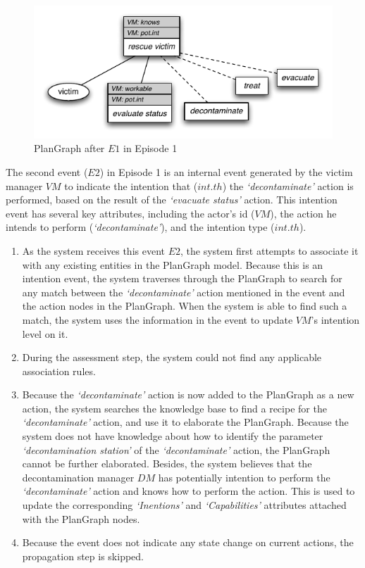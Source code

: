 \begin{figure}[htbp] %
	\centering
	\includegraphics{plangraph_ep1_e1.pdf} 
	\caption{PlanGraph after $E1$ in Episode 1}
	\label{fig:plangraph_ep1_e1}
\end{figure}

The second event ($E2$) in Episode 1 is an internal event generated by the victim manager $VM$ to indicate the intention that ($int.th$) the \emph{`decontaminate'} action is performed, based on the result of the \emph{`evacuate status'} action. This intention event has several key attributes, including the actor's id ($VM$), the action he intends to perform (\emph{`decontaminate'}), and the intention type ($int.th$).

\begin{enumerate}
	\item As the system receives this event $E2$, the system first attempts to associate it with any existing entities in the PlanGraph model. Because this is an intention event, the system traverses through the PlanGraph to search for any match between the \emph{`decontaminate'} action mentioned in the event and the action nodes in the PlanGraph. When the system is able to find such a match, the system uses the information in the event to update $VM$'s intention level on it.
	\item During the assessment step, the system could not find any applicable association rules.
	\item Because the \emph{`decontaminate'} action is now added to the PlanGraph as a new action, the system searches the knowledge base to find a recipe for the \emph{`decontaminate'} action, and use it to elaborate the PlanGraph. Because the system does not have knowledge about how to identify the parameter \emph{`decontamination station'} of the \emph{`decontaminate'} action, the PlanGraph cannot be further elaborated. Besides, the system believes that the decontamination manager $DM$ has potentially intention to perform the \emph{`decontaminate'} action and knows how to perform the action. This is used to update the corresponding \emph{`Inentions'} and \emph{`Capabilities'} attributes attached with the PlanGraph nodes.
	\item Because the event does not indicate any state change on current actions, the propagation step is skipped.
\end{enumerate}

